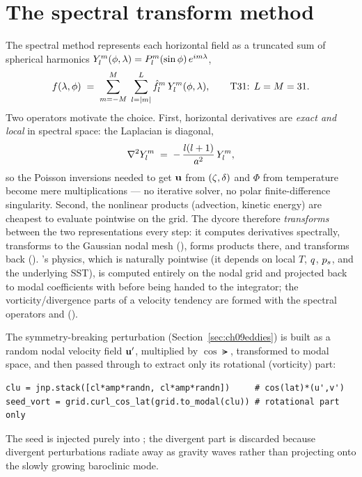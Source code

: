 \section{The spectral transform method}

The spectral method represents each horizontal field as a truncated sum of
spherical harmonics $Y_l^m(\phi,\lambda) = P_l^m(\sin\phi)\,e^{im\lambda}$,
\begin{equation}
  f(\lambda,\phi) \;=\; \sum_{m=-M}^{M}\;\sum_{l=|m|}^{L} \hat f_l^m\, Y_l^m(\phi,\lambda),
  \qquad \text{T31: } L = M = 31 .
\end{equation}
Two operators motivate the choice. First, horizontal derivatives are
\emph{exact and local} in spectral space: the Laplacian is diagonal,
\begin{equation}
  \nabla^{2} Y_l^m \;=\; -\,\frac{l(l+1)}{a^2}\,Y_l^m ,
  \label{eq:laplacian-eig}
\end{equation}
so the Poisson inversions needed to get $\mathbf{u}$ from $(\zeta,\delta)$ and $\Phi$
from temperature become mere multiplications --- no iterative solver, no polar
finite-difference singularity. Second, the nonlinear products (advection, kinetic
energy) are cheapest to evaluate pointwise on the grid. The dycore therefore
\emph{transforms} between the two representations every step: it computes
derivatives spectrally, transforms to the Gaussian nodal mesh
(), forms products there, and transforms back ().
\model{}'s physics, which is naturally pointwise (it depends on local $T$, $q$,
$p_s$, and the underlying SST), is computed entirely on the nodal grid and
projected back to modal coefficients with  before being handed to
the integrator; the vorticity/divergence parts of a velocity tendency are formed
with the spectral operators  and 
().

\begin{example}
The symmetry-breaking perturbation (Section~\ref{sec:ch09eddies}) is built as a
random nodal velocity field $\mathbf{u}'$, multiplied by $\cos\lat$, transformed to
modal space, and then passed through  to extract only its
rotational (vorticity) part:
\begin{lstlisting}
clu = jnp.stack([cl*amp*randn, cl*amp*randn])     # cos(lat)*(u',v')
seed_vort = grid.curl_cos_lat(grid.to_modal(clu)) # rotational part only
\end{lstlisting}
The seed is injected purely into ; the divergent part is
discarded because divergent perturbations radiate away as gravity waves rather
than projecting onto the slowly growing baroclinic mode.
\end{example}

